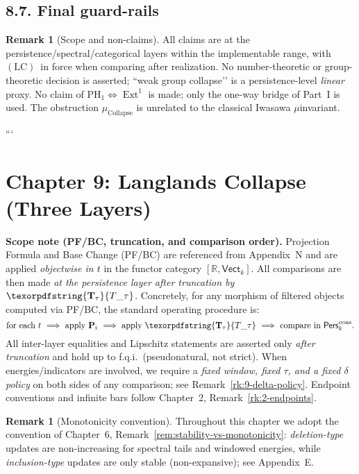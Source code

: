 \documentclass[11pt]{article}
\DeclareMathOperator{\Ext}{Ext}
\DeclareRobustCommand{\hyp}{\nobreakdash-}
\newcommand{\Pers}{\mathsf{Pers}}
\numberwithin{equation}{section}
\theoremstyle{definition}
\newtheorem{remark}[theorem]{Remark}
\DeclareRobustCommand{\Perskft}{\Pers^{\mathrm{cons}}_{k}}
\DeclareRobustCommand{\Ttau}{\texorpdfstring{\ensuremath{\mathbf{T}_{\tau}}}{T\_\tau}}
\DeclareRobustCommand{\LC}{\texorpdfstring{\ensuremath{\mathrm{(LC)}}}{(LC)}}
\begin{document}
\subsection*{8.7. Final guard\hyp rails}
\begin{remark}[Scope and non\hyp claims]\label{rk:8-guard}
All claims are at the persistence/spectral/categorical layers within the implementable range, with \LC\ in force when comparing after realization.
No number\hyp theoretic or group\hyp theoretic decision is asserted; “weak group collapse’’ is a persistence\hyp level \emph{linear} proxy.
No claim of \(\mathrm{PH}_1\Leftrightarrow\Ext^1\) is made; only the one\hyp way bridge of Part~I is used.
The obstruction \(\mu_{\mathrm{Collapse}}\) is unrelated to the classical Iwasawa \(\mu\)\nobreakdash invariant.
\end{remark}
```


\section{Chapter 9: Langlands Collapse (Three Layers)}

\noindent\textbf{Scope note (PF/BC, truncation, and comparison order).}
Projection Formula and Base Change (PF/BC) are referenced from Appendix~N and are applied \emph{objectwise in \(t\)} in the functor category \([\mathbb{R},\mathsf{Vect}_k]\).
All comparisons are then made \emph{at the persistence layer after truncation by \(\Ttau\)}.
Concretely, for any morphism of filtered objects computed via PF/BC, the standard operating procedure is:
\[
\text{for each } t \ \Longrightarrow\ \text{apply } \mathbf{P}_i \ \Longrightarrow\ \text{apply } \Ttau \ \Longrightarrow\ \text{compare in } \Perskft.
\]
All inter\hyp layer equalities and Lipschitz statements are asserted only \emph{after truncation} and hold up to f.q.i.\ (pseudonatural, not strict).
When energies/indicators are involved, we require a \emph{fixed window, fixed \(\tau\), and a fixed \(\delta\)\nobreakdash policy} on both sides of any comparison; see Remark~\ref{rk:9-delta-policy}.
Endpoint conventions and infinite bars follow Chapter~2, Remark~\ref{rk:2-endpoints}.

\begin{remark}[Monotonicity convention]
Throughout this chapter we adopt the convention of
Chapter~6, Remark~\ref{rem:stability-vs-monotonicity}:
\emph{deletion\hyp type} updates are non\hyp increasing for spectral tails and windowed energies,
while \emph{inclusion\hyp type} updates are only stable (non\hyp expansive); see Appendix~E.
\end{remark}
\end{document}
